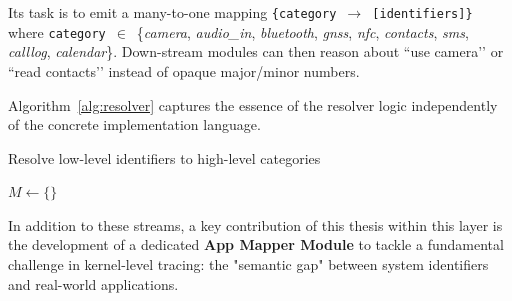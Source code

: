 \documentclass[a4paper,12pt]{report}
\begin{document}
Its task is to emit a many-to-one mapping
\texttt{\{category $\rightarrow$ [identifiers]\}} where
\texttt{category}~$\in$~\{\textit{camera}, \textit{audio\_in},
\textit{bluetooth}, \textit{gnss}, \textit{nfc},
\textit{contacts}, \textit{sms}, \textit{calllog},
\textit{calendar}\}.
Down-stream modules can then reason about ``use camera’’ or ``read
contacts’’ instead of opaque major/minor numbers.

Algorithm~\ref{alg:resolver} captures the essence of the resolver logic
independently of the concrete implementation language.

\begin{algorithm}[H]
\footnotesize
\caption{Resolve low-level identifiers to high-level categories}
\label{alg:resolver}
\DontPrintSemicolon
{}
$M \leftarrow \{\}$
\BlankLine
{}
\BlankLine
{}
\end{algorithm}
\BlankLine
\BlankLine
In addition to these streams, a key contribution of this thesis within this layer is the development of a dedicated \textbf{App Mapper Module} to tackle a fundamental challenge in kernel-level tracing: the "semantic gap" between system identifiers and real-world applications.
\end{document}
